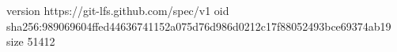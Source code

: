 version https://git-lfs.github.com/spec/v1
oid sha256:989069604ffed44636741152a075d76d986d0212c17f88052493bce69374ab19
size 51412
